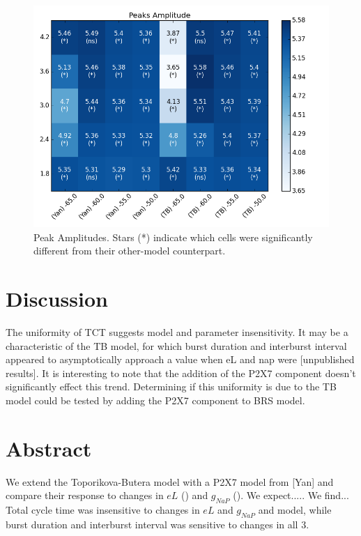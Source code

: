 \documentclass[11pt]{article}
\begin{document}
\begin{figure}[h]
	\centering
	\includegraphics[scale=.4]{heatmap_Peaks_Amplitude.png}
	\caption{Peak Amplitudes. Stars (*) indicate  which cells were significantly different from their other-model counterpart.}
	\label{fig:hmPA}

\end{figure}


%
\FloatBarrier
\section{Discussion}

The uniformity of TCT suggests model and parameter insensitivity. It may be a characteristic of the TB model, for which burst duration and interburst interval appeared to asymptotically approach a value when eL and nap were [unpublished results]. It is interesting to note that the addition of the P2X7 component doesn't significantly effect this trend. Determining if this uniformity is due to the TB model could be tested by adding the P2X7 component to BRS model.



 
 
 \section{Abstract}
We extend the Toporikova-Butera model with a P2X7 model from [Yan] and compare their response to changes in $eL$ () and $g_{NaP}$ ().
We expect.....
We find...
Total cycle time was insensitive to changes in $eL$ and $g_{NaP}$ and model, while burst duration and interburst interval was sensitive to changes in all 3.
 
\end{document}
